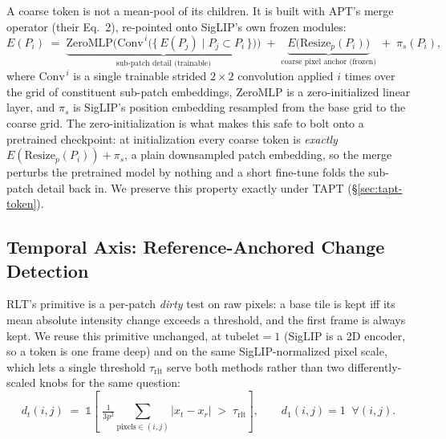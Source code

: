 A coarse token is not a mean-pool of its children. It is built with APT's merge
operator (their Eq.~2), re-pointed onto SigLIP's own frozen modules:
\begin{equation}
  \label{eq:apt-merge}
  E(P_i) \;=\; \underbrace{\mathrm{ZeroMLP}\Big(\mathrm{Conv}^{\,i}\big(\{\,E(P_j) \mid P_j \subset P_i\,\}\big)\Big)}_{\text{sub-patch detail (trainable)}}
  \;+\; \underbrace{E\big(\mathrm{Resize}_p(P_i)\big)}_{\text{coarse pixel anchor (frozen)}} \;+\; \pi_s(P_i),
\end{equation}
where $\mathrm{Conv}^{\,i}$ is a single trainable strided $2\!\times\!2$
convolution applied $i$ times over the grid of constituent sub-patch embeddings,
$\mathrm{ZeroMLP}$ is a zero-initialized linear layer, and $\pi_s$ is SigLIP's
position embedding resampled from the base grid to the coarse grid. The
zero-initialization is what makes this safe to bolt onto a pretrained checkpoint:
at initialization every coarse token is \emph{exactly} $E(\mathrm{Resize}_p(P_i))
+ \pi_s$, a plain downsampled patch embedding, so the merge perturbs the
pretrained model by nothing and a short fine-tune folds the sub-patch detail back
in. We preserve this property exactly under TAPT (\S\ref{sec:tapt-token}).

\subsection{Temporal Axis: Reference-Anchored Change Detection}
\label{sec:rlt}

RLT's primitive is a per-patch \emph{dirty} test on raw pixels: a base tile is
kept iff its mean absolute intensity change exceeds a threshold, and the first
frame is always kept. We reuse this primitive unchanged, at $\text{tubelet}=1$
(SigLIP is a 2D encoder, so a token is one frame deep) and on the same
SigLIP-normalized pixel scale, which lets a single threshold $\tau_{\text{rlt}}$
serve both methods rather than two differently-scaled knobs for the same
question:
\begin{equation}
  \label{eq:dirty}
  d_t(i,j) \;=\; \mathbb{1}\!\left[\;\tfrac{1}{3p^2}\!\!\sum_{\text{pixels} \in (i,j)}\!\! \big| x_t - x_{r} \big| \;>\; \tau_{\text{rlt}} \right],
  \qquad d_1(i,j) = 1 \;\; \forall (i,j).
\end{equation}

